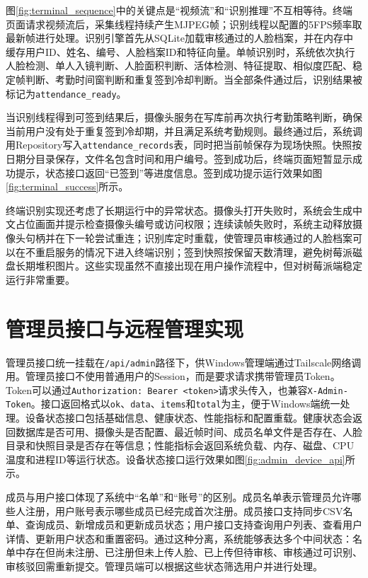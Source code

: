 图\ref{fig:terminal_sequence}中的关键点是“视频流”和“识别推理”不互相等待。终端页面请求视频流后，采集线程持续产生MJPEG帧；识别线程以配置的5FPS频率取最新帧进行处理。识别引擎首先从SQLite加载审核通过的人脸档案，并在内存中缓存用户ID、姓名、编号、人脸档案ID和特征向量。单帧识别时，系统依次执行人脸检测、单人入镜判断、人脸面积判断、活体检测、特征提取、相似度匹配、稳定帧判断、考勤时间窗判断和重复签到冷却判断。当全部条件通过后，识别结果被标记为\texttt{attendance\_ready}。

当识别线程得到可签到结果后，摄像头服务在写库前再次执行考勤策略判断，确保当前用户没有处于重复签到冷却期，并且满足系统考勤规则。最终通过后，系统调用Repository写入\texttt{attendance\_records}表，同时把当前帧保存为现场快照。快照按日期分目录保存，文件名包含时间和用户编号。签到成功后，终端页面短暂显示成功提示，状态接口返回“已签到”等进度信息。签到成功提示运行效果如图\ref{fig:terminal_success}所示。


终端识别实现还考虑了长期运行中的异常状态。摄像头打开失败时，系统会生成中文占位画面并提示检查摄像头编号或访问权限；连续读帧失败时，系统主动释放摄像头句柄并在下一轮尝试重连；识别库定时重载，使管理员审核通过的人脸档案可以在不重启服务的情况下进入终端识别；签到快照按保留天数清理，避免树莓派磁盘长期堆积图片。这些实现虽然不直接出现在用户操作流程中，但对树莓派端稳定运行非常重要。

\section{管理员接口与远程管理实现}

管理员接口统一挂载在\texttt{/api/admin}路径下，供Windows管理端通过Tailscale网络调用。管理员接口不使用普通用户的Session，而是要求请求携带管理员Token。Token可以通过\texttt{Authorization: Bearer <token>}请求头传入，也兼容\texttt{X-Admin-Token}。接口返回格式以\texttt{ok}、\texttt{data}、\texttt{items}和\texttt{total}为主，便于Windows端统一处理。设备状态接口包括基础信息、健康状态、性能指标和配置重载。健康状态会返回数据库是否可用、摄像头是否配置、最近帧时间、成员名单文件是否存在、人脸目录和快照目录是否存在等信息；性能指标会返回系统负载、内存、磁盘、CPU温度和进程ID等运行状态。设备状态接口运行效果如图\ref{fig:admin_device_api}所示。


成员与用户接口体现了系统中“名单”和“账号”的区别。成员名单表示管理员允许哪些人注册，用户账号表示哪些成员已经完成首次注册。成员接口支持同步CSV名单、查询成员、新增成员和更新成员状态；用户接口支持查询用户列表、查看用户详情、更新用户状态和重置密码。通过这种分离，系统能够表达多个中间状态：名单中存在但尚未注册、已注册但未上传人脸、已上传但待审核、审核通过可识别、审核驳回需重新提交。管理员端可以根据这些状态筛选用户并进行处理。

